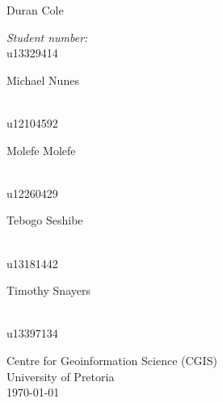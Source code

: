 \documentclass[a4paper,12pt]{report}
\begin{document}
\begin{titlepage}
\begin{center}
\begin{minipage}{0.4\textwidth}
\begin{flushleft}
Duran {Cole}
\end{flushleft}
\end{minipage}
\begin{minipage}{0.4\textwidth}
\begin{flushright} \large
\emph{Student number:} \\
u13329414
\end{flushright}
\end{minipage}
\begin{minipage}{0.4\textwidth}
\begin{flushleft} \large
Michael {Nunes}
\end{flushleft}
\end{minipage}
\begin{minipage}{0.4\textwidth}
\begin{flushright} \large
\emph{} \\
u12104592
\end{flushright}
\end{minipage}
\begin{minipage}{0.4\textwidth}
\begin{flushleft} \large
Molefe {Molefe}
\end{flushleft}
\end{minipage}
\begin{minipage}{0.4\textwidth}
\begin{flushright} \large
\emph{} \\
u12260429
\end{flushright}
\end{minipage}
\begin{minipage}{0.4\textwidth}
\begin{flushleft} \large
Tebogo {Seshibe}
\end{flushleft}
\end{minipage}
\begin{minipage}{0.4\textwidth}
\begin{flushright} \large
\emph{} \\
u13181442
\end{flushright}
\end{minipage}
\begin{minipage}{0.4\textwidth}
\begin{flushleft} \large
Timothy {Snayers}
\end{flushleft}
\end{minipage}
\begin{minipage}{0.4\textwidth}
\begin{flushright} \large
\emph{} \\
u13397134
\end{flushright}
\end{minipage}
\vfill
{\large Centre for Geoinformation Science (CGIS)\\}
{\large University of Pretoria}\\[0.4cm]
{\large \today}
\end{center}
\end{titlepage}
\footnotesize
%
\normalsize
\end{document}

